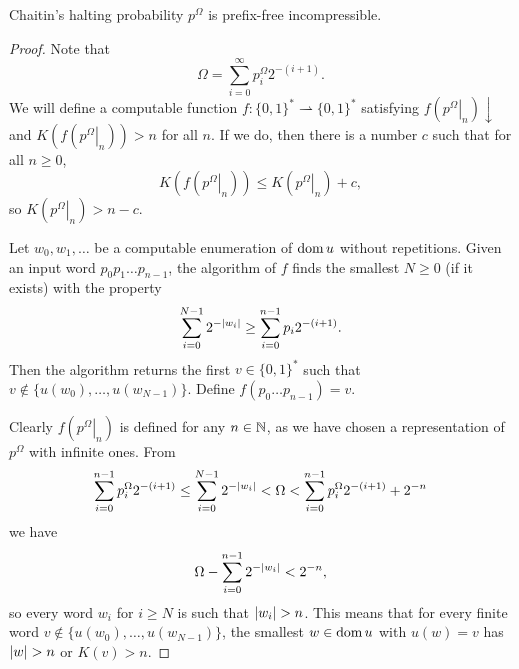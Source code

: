 \begin{theorem}
  Chaitin's halting probability $p^\Omega$ is prefix-free incompressible.
\end{theorem}

\begin{proof}
  Note that
  \[
	\Omega = \sum_{i=0}^\infty p_i^\Omega 2^{-(i+1)}.
  \]
  We will define a computable function $f: \{0,1\}^* \rightharpoonup \{0,1\}^*$
  satisfying $f(\left. p^\Omega \right|_n) \downarrow$ and $K(f(\left. p^\Omega
  \right|_n)) > n$ for all $n$.
  If we do, then there is a number $c$ such that for all $n \ge 0$,
  \[
	K(f(\left. p^\Omega \right|_n)) \le K(\left. p^\Omega \right|_n) + c,
  \]
  so $K(\left. p^\Omega \right|_n) > n-c$.

  Let $w_0, w_1, \ldots$ be a computable enumeration of $\operatorname{dom} u$ without
  repetitions.
  Given an input word $p_0 p_1 \ldots p_{n-1}$, the algorithm of $f$ finds the
  smallest $N \ge 0$ (if it exists) with the property
  \[
	\sum_{i=0}^{N-1} 2^{-\left| w_i \right|} \ge \sum_{i=0}^{n-1} p_i 2^{-(i+1)}.
  \]
  Then the algorithm returns the first $v \in \{0,1\}^*$ such that $v \notin \{
  u(w_0), \ldots, u(w_{N-1})\}$.
  Define $f(p_0 \ldots p_{n-1}) = v$.

  Clearly $f(\left. p^\Omega \right|_n)$ is defined for any $n \in \mathbb{N}$, as we
  have chosen a representation of $p^\Omega$ with infinite ones.
  From
  \[
	\sum_{i=0}^{n-1} p_i^\Omega 2^{-(i+1)}
	\le \sum_{i=0}^{N-1} 2^{-\left| w_i \right|}
	< \Omega
	< \sum_{i=0}^{n-1} p_i^\Omega 2^{-(i+1)} + 2^{-n}
  \]
  we have
  \[
	\Omega - \sum_{i=0}^{n-1} 2^{-\left| w_i \right|} < 2^{-n},
  \]
  so every word $w_i$ for $i \ge N$ is such that $\left| w_i \right| > n$.
  This means that for every finite word $v \notin \{ u(w_0), \ldots, u(w_{N-1})
  \}$, the smallest $w \in \operatorname{dom} u$ with $u(w) = v$ has $\left| w \right| > n$ or $K(v) >
  n$.
\end{proof}

